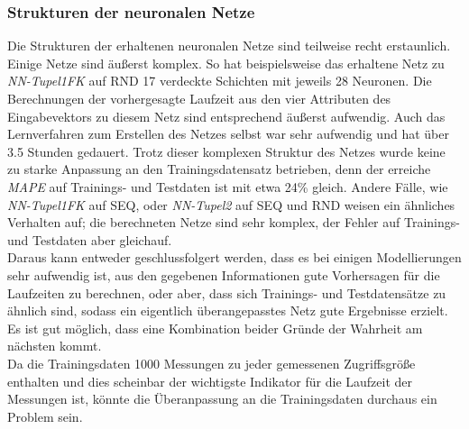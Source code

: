 \documentclass[
	12pt,
	a4paper,
	BCOR10mm,
	DIV14,
	listof=totoc,
	bibliography=totoc,
	headsepline
]{scrreprt}
\begin{document}
\begin{table}
	\scriptsize
	\caption{Informationen über die Ausreißervorhersage der NN-Modelle auf SEQ}
	\label{tab:outlier}
\end{table}

\subsubsection{Strukturen der neuronalen Netze}
Die Strukturen der erhaltenen neuronalen Netze sind teilweise recht erstaunlich.
Einige Netze sind äußerst komplex.
So hat beispielsweise das erhaltene Netz zu \textit{NN-Tupel1FK} auf RND 17 verdeckte Schichten mit jeweils 28 Neuronen.
Die Berechnungen der vorhergesagte Laufzeit aus den vier Attributen des Eingabevektors zu diesem Netz sind entsprechend äußerst aufwendig.
Auch das Lernverfahren zum Erstellen des Netzes selbst war sehr aufwendig und hat über 3.5 Stunden gedauert.
Trotz dieser komplexen Struktur des Netzes wurde keine zu starke Anpassung an den Trainingsdatensatz betrieben, denn der erreiche \textit{MAPE} auf Trainings- und Testdaten ist mit etwa 24\% gleich. Andere Fälle, wie \textit{NN-Tupel1FK} auf SEQ, oder \textit{NN-Tupel2} auf SEQ und RND weisen ein ähnliches Verhalten auf; die berechneten Netze sind sehr komplex, der Fehler auf Trainings- und Testdaten aber gleichauf.\\
Daraus kann entweder geschlussfolgert werden, dass es bei einigen Modellierungen sehr aufwendig ist, aus den gegebenen Informationen gute Vorhersagen für die Laufzeiten zu berechnen, oder aber, dass sich Trainings- und Testdatensätze zu ähnlich sind, sodass ein eigentlich überangepasstes Netz gute Ergebnisse erzielt. Es ist gut möglich, dass eine Kombination beider Gründe der Wahrheit am nächsten kommt.\\
Da die Trainingsdaten 1000 Messungen zu jeder gemessenen Zugriffsgröße enthalten und dies scheinbar der wichtigste Indikator für die Laufzeit der Messungen ist, könnte die Überanpassung an die Trainingsdaten durchaus ein Problem sein.\medskip
\end{document}
